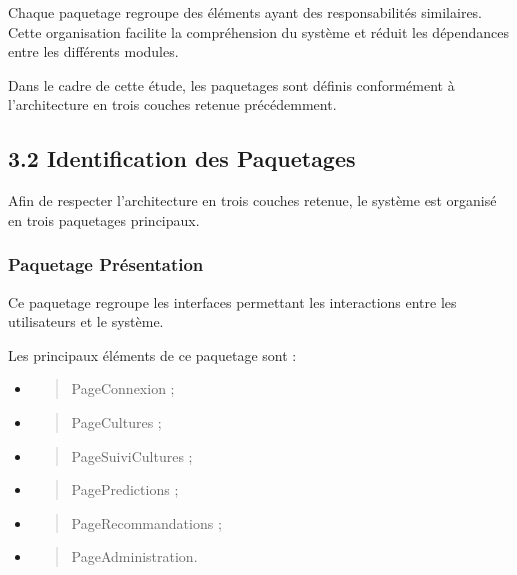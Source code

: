 \documentclass[
]{article}
\begin{document}
Chaque paquetage regroupe des éléments ayant des responsabilités
similaires. Cette organisation facilite la compréhension du système et
réduit les dépendances entre les différents modules.

Dans le cadre de cette étude, les paquetages sont définis conformément à
l'architecture en trois couches retenue précédemment.

\hypertarget{identification-des-paquetages}{%
\subsection{3.2 Identification des
Paquetages}\label{identification-des-paquetages}}

Afin de respecter l'architecture en trois couches retenue, le système
est organisé en trois paquetages principaux.

\hypertarget{paquetage-pruxe9sentation}{%
\subsubsection{Paquetage Présentation}\label{paquetage-pruxe9sentation}}

Ce paquetage regroupe les interfaces permettant les interactions entre
les utilisateurs et le système.

Les principaux éléments de ce paquetage sont :

\begin{itemize}
\item
  \begin{quote}
  PageConnexion ;
  \end{quote}
\item
  \begin{quote}
  PageCultures ;
  \end{quote}
\item
  \begin{quote}
  PageSuiviCultures ;
  \end{quote}
\item
  \begin{quote}
  PagePredictions ;
  \end{quote}
\item
  \begin{quote}
  PageRecommandations ;
  \end{quote}
\item
  \begin{quote}
  PageAdministration.
  \end{quote}
\end{itemize}
\end{document}
